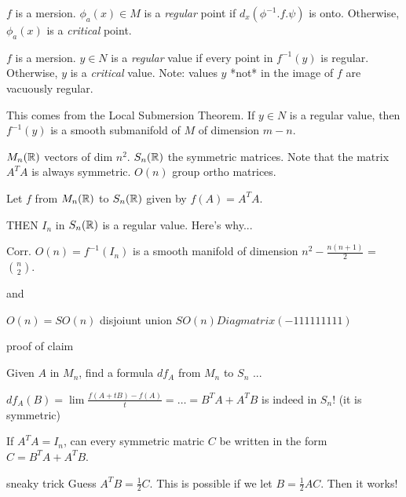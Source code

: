 \documentclass[11pt,leqno,oneside]{amsart}
\begin{document}
\begin{defn}
	$f$ is a mersion.
	$\phi_a(x) \in M$ is a \emph{regular} point if $d_x(\phi^{-1}.f.\psi)$ is onto.  Otherwise, $\phi_a(x)$ is a \emph{critical} point.
\end{defn}

\begin{defn}
	$f$ is a mersion.
	$y \in N$ is a \emph{regular} value if every point in $f^{-1}(y)$ is regular.  Otherwise, $y$ is a \emph{critical} value.  Note: values $y$ *not* in the image of $f$ are vacuously regular.
\end{defn}

\begin{thm}
	This comes from the Local Submersion Theorem.  If $y \in N$ is a regular value, then $f^{-1}(y)$ is a smooth submanifold of $M$ of dimension $m-n$.
\end{thm}

\begin{example}
	$M_n({\mathbb R})$ vectors of dim $n^2$.  $S_n({\mathbb R})$ the symmetric matrices.  Note that the matrix $A^T A$ is always symmetric.  $O(n)$ group ortho matrices.

	Let $f$ from $M_n({\mathbb R})$ to $S_n({\mathbb R})$ given by $f(A) = A^T A$.

	THEN $I_n$ in $S_n({\mathbb R})$ is a regular value.  Here's why...

	Corr. $O(n) = f^{-1}(I_n)$ is a smooth manifold of dimension $n^2 - \frac{n(n+1)}{2}$ = $\binom n2$.

	and

	$O(n) = SO(n)$ disjoiunt union $SO(n)Diagmatrix(-1 1 1 1 1 1 1 1 1)$

	proof of claim

	Given $A$ in $M_n$, find a formula $df_A$ from $M_n$ to $S_n$ ...

	$df_A(B) = \lim \frac{f(A+tB) - f(A)}{t} = \ldots = B^T A + A^T B$
	is indeed in $S_n$! (it is symmetric)

	If $A^T A = I_n$, can every symmetric matric $C$ be written in the form $C = B^T A + A^T B$.

	sneaky trick
	Guess $A^T B = \frac12 C$.
	This is possible if we let $B = \frac12 AC$.
	Then it works!
\end{example}
\end{document}
